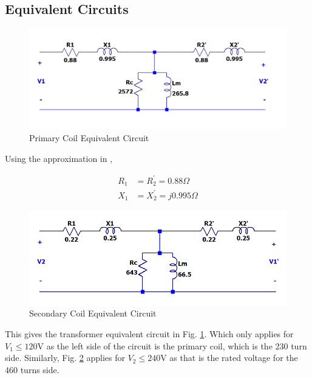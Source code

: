 \documentclass{IEEEtran}
\begin{document}
\subsection{Equivalent Circuits}


\begin{figure}[h!]
    \includegraphics[width=\columnwidth]{eq-ckt.png}
    \caption{Primary Coil Equivalent Circuit} 
    \label{fig:eq-ckt}
\end{figure}

Using the approximation in \cite{labmanual},

 \begin{align*}
    R_1 &= R_2^{'} = 0.88 \Omega \\
    X_1 &= X_2^{'} = j0.995 \Omega 
\end{align*}

\begin{figure}[h!]
    \includegraphics[width=\columnwidth]{eq-ckt-sec.png}
    \caption{Secondary Coil Equivalent Circuit} 
    \label{fig:eq-ckt-sec}
\end{figure}



This gives the transformer equivalent circuit in Fig. \ref{fig:eq-ckt}. Which  only applies for \(V_1 \leq 120\)V as the left side of the circuit is the primary coil, which is the 230 turn side. Similarly, Fig. \ref{fig:eq-ckt-sec} applies for \(V_2 \leq 240\)V as that is the rated voltage for the 460 turns side. 




\end{document}

